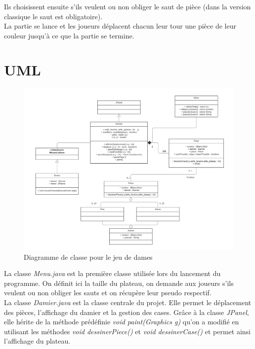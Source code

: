 \documentclass[12,french]{report}
\begin{document}
Ils choisissent ensuite s'ils veulent ou non obliger le saut de pièce (dans la version classique le saut est obligatoire).\\

La partie se lance et les joueurs déplacent chacun leur tour une pièce de leur couleur jusqu'à ce que la partie se termine.


\section{UML}

\begin{figure}[H]
	\center
	\includegraphics[width=1\textwidth]{./Images/UML}
	\caption{Diagramme de classe pour le jeu de dames}
\end{figure}\vspace{0.2cm}

La classe \textit{Menu.java} est la première classe utilisée lors du lancement du programme. On définit ici la taille du plateau, on demande aux joueurs s'ils veulent ou non obliger les sauts et on récupère leur pseudo respectif.\\

La classe \textit{Damier.java} est la classe centrale du projet. Elle permet le déplacement des pièces, l'affichage du damier et la gestion des cases. Grâce à la classe \textit{JPanel}, elle hérite de la méthode prédéfinie \textit{void paint(Graphics g)} qu'on a modifié en utilisant les méthodes \textit{void dessinerPiece()} et \textit{void dessinerCase()} et permet ainsi l'affichage du plateau.\\
\end{document}
